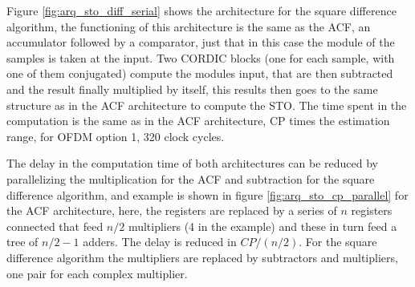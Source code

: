 Figure \ref{fig:arq_sto_diff_serial} shows the architecture for the square difference algorithm, the functioning of this architecture is the same as the ACF, an accumulator followed by a comparator, just that in this case the module of the samples is taken at the input. Two CORDIC blocks (one for each sample, with one of them conjugated) compute the modules input, that are then subtracted and the result finally multiplied by itself, this results then goes to the same structure as in the ACF architecture to compute the STO. The time spent in the computation is the same as in the ACF architecture, CP times the estimation range, for OFDM option 1, 320 clock cycles. 

The delay in the computation time of both architectures can be reduced by parallelizing the multiplication for the ACF and subtraction for the square difference algorithm, and example is shown in figure \ref{fig:arq_sto_cp_parallel} for the ACF architecture, here, the registers are replaced by a series of $n$ registers connected that feed $n/2$ multipliers (4 in the example) and these in turn feed a tree of $n/2-1$ adders. The delay is reduced in $CP/(n/2)$. For the square difference algorithm the multipliers are replaced by subtractors and multipliers, one pair for each complex multiplier. %




